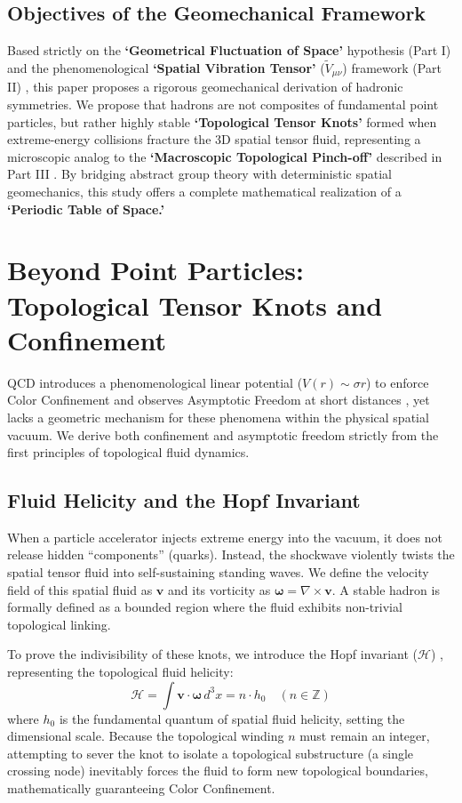 \documentclass[reprint,amsmath,amssymb,aps,prd]{revtex4-2}
\begin{document}
\subsection{Objectives of the Geomechanical Framework}
Based strictly on the \textbf{`Geometrical Fluctuation of Space'} hypothesis (Part I) \cite{YooPart1} and the phenomenological \textbf{`Spatial Vibration Tensor'} ($\tilde{V}_{\mu\nu}$) framework (Part II) \cite{YooPart2}, this paper proposes a rigorous geomechanical derivation of hadronic symmetries. We propose that hadrons are not composites of fundamental point particles, but rather highly stable \textbf{`Topological Tensor Knots'} formed when extreme-energy collisions fracture the 3D spatial tensor fluid, representing a microscopic analog to the \textbf{`Macroscopic Topological Pinch-off'} described in Part III \cite{YooPart3}. By bridging abstract group theory with deterministic spatial geomechanics, this study offers a complete mathematical realization of a \textbf{`Periodic Table of Space.'}

\section{Beyond Point Particles: Topological Tensor Knots and Confinement}

QCD introduces a phenomenological linear potential ($V(r) \sim \sigma r$) to enforce Color Confinement and observes Asymptotic Freedom at short distances \cite{Gross1973}, yet lacks a geometric mechanism for these phenomena within the physical spatial vacuum. We derive both confinement and asymptotic freedom strictly from the first principles of topological fluid dynamics.

\subsection{Fluid Helicity and the Hopf Invariant}
When a particle accelerator injects extreme energy into the vacuum, it does not release hidden ``components'' (quarks). Instead, the shockwave violently twists the spatial tensor fluid into self-sustaining standing waves. We define the velocity field of this spatial fluid as $\mathbf{v}$ and its vorticity as $\boldsymbol{\omega} = \nabla \times \mathbf{v}$. A stable hadron is formally defined as a bounded region where the fluid exhibits non-trivial topological linking.

To prove the indivisibility of these knots, we introduce the Hopf invariant ($\mathcal{H}$) \cite{Moffatt1969}, representing the topological fluid helicity:
\begin{equation}
\mathcal{H} = \int \mathbf{v} \cdot \boldsymbol{\omega} \, d^3x = n \cdot h_0 \quad (n \in \mathbb{Z})
\end{equation}
where $h_0$ is the fundamental quantum of spatial fluid helicity, setting the dimensional scale. Because the topological winding $n$ must remain an integer, attempting to sever the knot to isolate a topological substructure (a single crossing node) inevitably forces the fluid to form new topological boundaries, mathematically guaranteeing Color Confinement.
\end{document}
